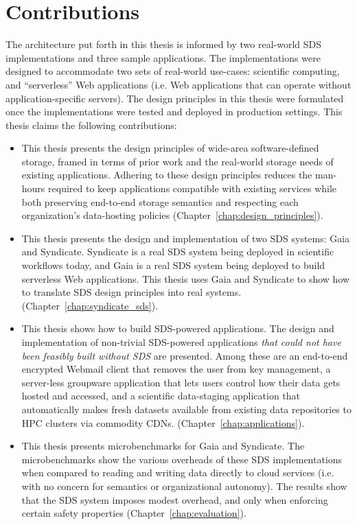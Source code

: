 \section{Contributions}

The architecture put forth in this thesis is informed by two real-world SDS
implementations and three sample applications.  The implementations were 
designed to accommodate two sets of real-world use-cases: scientific computing,
and ``serverless'' Web applications (i.e. Web applications that can operate
without application-specific servers).
The design principles in this thesis 
were formulated once the implementations were tested and
deployed in production settings.  This thesis claims the following contributions:

\begin{itemize}

\item This thesis presents the design principles of wide-area software-defined storage, framed in
terms of prior work and the real-world storage needs of existing applications.
Adhering to these design principles reduces the man-hours required to keep applications compatible
with existing services while both preserving end-to-end storage semantics and
respecting each organization's data-hosting policies (Chapter~\ref{chap:design_principles}).

\item This thesis presents the design and implementation of two SDS systems: Gaia and
Syndicate.  Syndicate is a real SDS system being deployed in scientific
workflows today, and Gaia is a real SDS system being deployed to build
serverless Web applications.
This thesis uses Gaia and Syndicate to show how to translate SDS design
principles into real systems.
(Chapter~\ref{chap:syndicate_sds}).

\item This thesis shows how to build SDS-powered applications.  The design and
implementation of non-trivial SDS-powered applications \emph{that could not
have been feasibly built without SDS} are presented.  Among these are an end-to-end encrypted
Webmail client that removes the user from key management, a server-less
groupware application that lets users control how their data gets hosted and
accessed, and a scientific data-staging application that
automatically makes fresh datasets available from existing data repositories to
HPC clusters via commodity CDNs.
(Chapter~\ref{chap:applications}).

\item This thesis presents microbenchmarks for Gaia and Syndicate.  The
microbenchmarks show the various overheads of these SDS implementations when
compared to reading and writing data directly to cloud services (i.e. with no
concern for semantics or organizational autonomy).  The results show that the SDS
system imposes modest overhead, and only when enforcing certain safety
properties (Chapter~\ref{chap:evaluation}).

\end{itemize}

